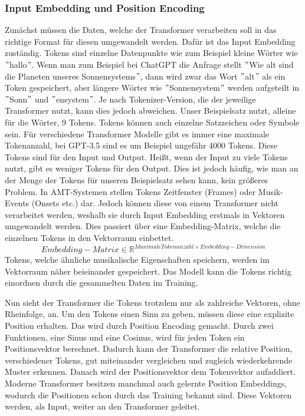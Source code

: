 \subsubsection{Input Embedding und Position Encoding}
Zunächst müssen die Daten, welche der Transformer verarbeiten soll in das richtige Format für diesen umgewandelt werden.
Dafür ist das Input Embedding zuständig.
Tokens sind einzelne Datenpunkte wie zum Beispiel kleine Wörter wie \("\)hallo\("\).
Wenn man zum Beispiel bei ChatGPT die Anfrage stellt \("\)Wie alt sind die Planeten unseres Sonnensystems\("\),
dann wird zwar das Wort \("\)alt\("\) als ein Token gespeichert, aber längere Wörter wie \("\)Sonnensystem\("\)
werden aufgeteilt in \("\)Sonn\("\) und \("\)ensystem\("\).
Je nach Tokenizer-Version, die der jeweilige Transformer nutzt, kann dies jedoch abweichen.
Unser Beispielsatz nutzt, alleine für die Wörter, 9 Tokens.
Tokens können auch einzelne Satzzeichen oder Symbole sein.
Für verschiedene Transformer Modelle gibt es immer eine maximale Tokenanzahl,
bei GPT-3.5 sind es um Beispiel ungefähr 4000 Tokens.
Diese Tokens sind für den Input und Output.
Heißt, wenn der Input zu viele Tokens nutzt, gibt es weniger Tokens für den Output.
Dies ist jedoch häufig, wie man an der Menge der Tokens für unseren Beispielsatz sehen kann, kein größeres Problem.
In AMT-Systemen stellen Tokens Zeitfenster (Frames) oder Musik-Events (Onsets etc.) dar.
Jedoch können diese von einem Transformer nicht verarbeitet werden,
weshalb sie durch Input Embedding erstmals in Vektoren  umgewandelt werden.
Dies passiert über eine Embedding-Matrix, welche die einzelnen Tokens in den Vektorraum einbettet.
\[
Embedding-Matrix \in \mathbb{R}^{Maximale Tokenanzahl \times Embedding-Dimension}
\]
Tokens, welche ähnliche musikalische Eigenschaften speichern, werden im Vektorraum näher beieinander gespeichert.
Das Modell kann die Tokens richtig einordnen durch die gesammelten Daten im Training.

Nun sieht der Transformer die Tokens trotzdem nur als zahlreiche Vektoren, ohne Rheinfolge, an.
Um den Tokens einen Sinn zu geben, müssen diese eine explizite Position erhalten.
Das wird durch Position Encoding gemacht.
Durch zwei Funktionen, eine Sinus und eine Cosinus, wird für jeden Token ein Positionsvektor berechnet.
Dadurch kann der Transformer die relative Position, verschiedener Tokens,
gut miteinander vergleichen und zugleich wiederkehrende Muster erkennen.
Danach wird der Positionsvektor dem Tokenvektor aufaddiert.
Moderne Transformer besitzen manchmal auch gelernte Position Embeddings,
wodurch die Positionen schon durch das Training bekannt sind.
Diese Vektoren werden, als Input, weiter an den Transformer geleitet.

